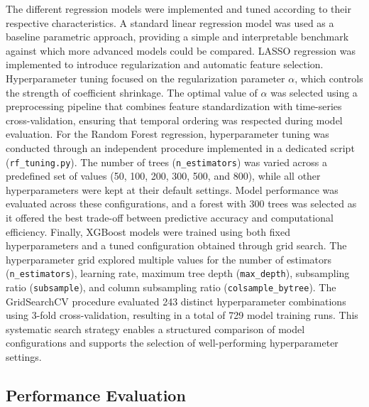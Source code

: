 \documentclass[11pt,a4paper]{article}
\begin{document}
The different regression models were implemented and tuned according to their respective characteristics. A standard linear regression model was used as a baseline parametric approach, providing a simple and interpretable benchmark against which more advanced models could be compared.
LASSO regression was implemented to introduce regularization and automatic feature selection. Hyperparameter tuning focused on the regularization parameter $\alpha$, which controls the strength of coefficient shrinkage. The optimal value of $\alpha$ was selected using a preprocessing pipeline that combines feature standardization with time-series cross-validation, ensuring that temporal ordering was respected during model evaluation.
For the Random Forest regression, hyperparameter tuning was conducted through an independent procedure implemented in a dedicated script (\texttt{rf\_tuning.py}). The number of trees (\texttt{n\_estimators}) was varied across a predefined set of values (50, 100, 200, 300, 500, and 800), while all other hyperparameters were kept at their default settings. Model performance was evaluated across these configurations, and a forest with 300 trees was selected as it offered the best trade-off between predictive accuracy and computational efficiency.
Finally, XGBoost models were trained using both fixed hyperparameters and a tuned configuration obtained through grid search. The hyperparameter grid explored multiple values for the number of estimators (\texttt{n\_estimators}), learning rate, maximum tree depth (\texttt{max\_depth}), subsampling ratio (\texttt{subsample}), and column subsampling ratio (\texttt{colsample\_bytree}). The GridSearchCV procedure evaluated 243 distinct hyperparameter combinations using 3-fold cross-validation, resulting in a total of 729 model training runs. This systematic search strategy enables a structured comparison of model configurations and supports the selection of well-performing hyperparameter settings.



\subsection{Performance Evaluation}
\end{document}
